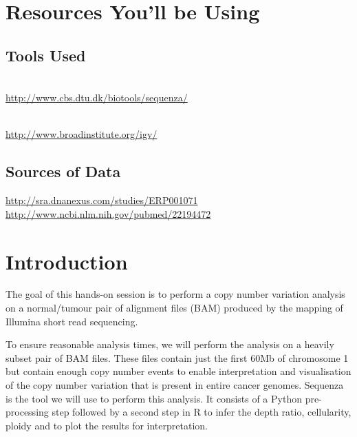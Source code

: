 \section{Resources You'll be Using}

\subsection{Tools Used}

\begin{description}[style=multiline,labelindent=0cm,align=left,leftmargin=1cm]
  \item[Sequenza] \hfill\\
    \url{http://www.cbs.dtu.dk/biotools/sequenza/}
  \item[IGV] \hfill\\
    \url{http://www.broadinstitute.org/igv/}
\end{description}


\subsection{Sources of Data}

\url{http://sra.dnanexus.com/studies/ERP001071}\\
\url{http://www.ncbi.nlm.nih.gov/pubmed/22194472}


\newpage


\section{Introduction}

The goal of this hands-on session is to perform a copy number variation analysis on a normal/tumour pair of alignment files (BAM) produced by the mapping of Illumina short read sequencing. 

To ensure reasonable analysis times, we will perform the analysis on a heavily subset pair of BAM files. These files contain just the first 60Mb of chromosome 1 but contain enough copy number events to enable interpretation and visualisation of the copy number variation that is present in entire cancer genomes. Sequenza is the tool we will use to perform this analysis. It consists of a Python pre-processing step followed by a second step in R to infer the depth ratio, cellularity, ploidy and to plot the results for interpretation.

